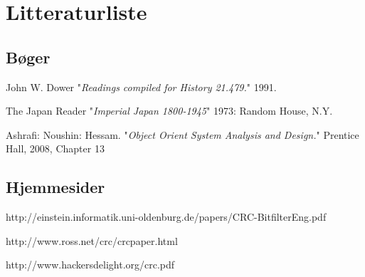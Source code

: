 \section{Litteraturliste}
\begingroup
\renewcommand{\section}[2]{}%

\begin{thebibliography}{1}
	\subsection{Bøger}
   John W. Dower "{\em Readings compiled for History
  21.479.}"  1991. %

    The Japan Reader "{\em Imperial Japan 1800-1945}" 1973:
  Random House, N.Y. %
  
   Ashrafi: Noushin: Hessam. "{\em Object Orient System Analysis and Design.}" Prentice Hall, 2008, Chapter 13
  
	\subsection{Hjemmesider}
   {http://einstein.informatik.uni-oldenburg.de/papers/CRC-BitfilterEng.pdf}

   {http://www.ross.net/crc/crcpaper.html}
  
   {http://www.hackersdelight.org/crc.pdf}

  \end{thebibliography}